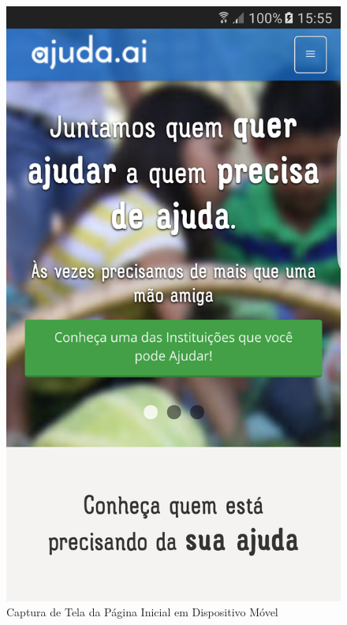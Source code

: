 \begin{figure}[H]
 \centering
  \begin{minipage}{0.4\textwidth}
    \centering
    \caption{Captura de Tela da Página Inicial em Dispositivo Móvel}
    \label{fig:ss_ajudaai_05}
    \includegraphics[scale=0.12]{imagens/screenshot-ajudaai-05.png}
  \end{minipage}
  \hfill
  \begin{minipage}{0.4\textwidth}

\end{minipage}
\end{figure}

